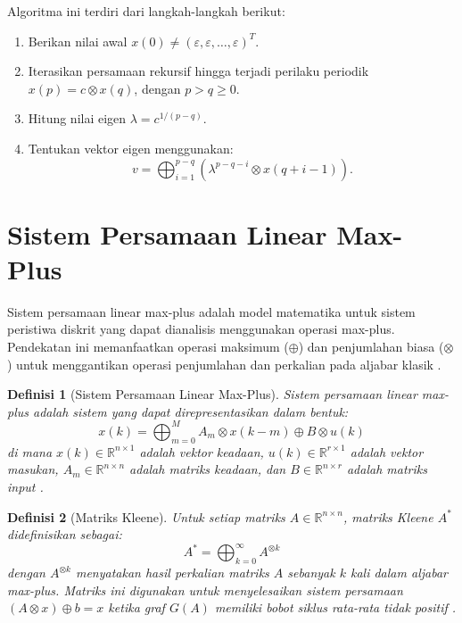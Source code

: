 \documentclass{file/TA-ITS}
\newtheorem{definisi}{Definisi}[section]
\theoremstyle{definition}
\theoremstyle{definition}
\theoremstyle{plain}
\newcommand{\Real}{\mathbb{R}}
\begin{document}
Algoritma ini terdiri dari langkah-langkah berikut:
\begin{enumerate}
     \item Berikan nilai awal \( x(0) \neq (\varepsilon, \varepsilon, \dots, \varepsilon)^T \).
        \item Iterasikan persamaan rekursif hingga terjadi perilaku periodik \( x(p) = c \otimes x(q) \), dengan \( p > q \geq 0 \).
        \item Hitung nilai eigen \( \lambda = c^{1/(p-q)} \).
        \item Tentukan vektor eigen menggunakan:
        \[
        v = \bigoplus_{i=1}^{p-q} \left( \lambda^{p-q-i} \otimes x(q+i-1) \right).
        \]
\end{enumerate}

\section{Sistem Persamaan Linear Max-Plus}

Sistem persamaan linear max-plus adalah model matematika untuk sistem peristiwa diskrit yang dapat dianalisis menggunakan operasi max-plus. Pendekatan ini memanfaatkan operasi maksimum (\(\oplus\)) dan penjumlahan biasa (\(\otimes\)) untuk menggantikan operasi penjumlahan dan perkalian pada aljabar klasik \cite{baccelli, heidergott}.

\begin{definisi}[Sistem Persamaan Linear Max-Plus]
Sistem persamaan linear max-plus adalah sistem yang dapat direpresentasikan dalam bentuk:
\[
x(k) = \bigoplus_{m=0}^M A_m \otimes x(k-m) \oplus B \otimes u(k)
\]
di mana \(x(k) \in \Real^{n \times 1}\) adalah vektor keadaan, \(u(k) \in \Real^{r \times 1}\) adalah vektor masukan, \(A_m \in \Real^{n \times n}\) adalah matriks keadaan, dan \(B \in \Real^{n \times r}\) adalah matriks input \cite{baccelli}.
\end{definisi}

\begin{definisi}[Matriks Kleene]
Untuk setiap matriks \(A \in \Real^{n \times n}\), matriks Kleene \(A^*\) didefinisikan sebagai:
\[
A^* = \bigoplus_{k=0}^\infty A^{\otimes k}
\]
dengan \(A^{\otimes k}\) menyatakan hasil perkalian matriks \(A\) sebanyak \(k\) kali dalam aljabar max-plus. Matriks ini digunakan untuk menyelesaikan sistem persamaan \((A \otimes x) \oplus b = x\) ketika graf \(G(A)\) memiliki bobot siklus rata-rata tidak positif \cite{subiono2015minmaxplus}.
\end{definisi}
\end{document}
